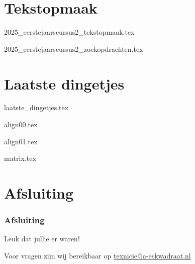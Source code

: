 \documentclass[allauthors,dutch]{../../cursuspresentatie}
\def\importslidej#1#2{%
	{#2}
}
\def\importslidey#1#2{%
	{#2}
}
\begin{document}
\section{Tekstopmaak}
\def\placetarget{\hypertarget{tekstopmaak}{}}
\importslidej{cursus2}{2025_eerstejaarscursus2_tekstopmaak.tex}
\importslidej{cursus2}{2025_eerstejaarscursus2_zoekopdrachten.tex}

\section{Laatste dingetjes}
\def\placetarget{\hypertarget{laatste}{}}
\importslidey{2025-eerstejaars_cursus_2}{laatste_dingetjes.tex}
\importslidey{2025-eerstejaars_cursus_2}{align00.tex}
\importslidey{2025-eerstejaars_cursus_2}{align01.tex}
\importslidey{2025-eerstejaars_cursus_2}{matrix.tex}

\section{Afsluiting}
\begin{frame}
	\frametitle{Afsluiting}
	Leuk dat jullie er waren!
	
	Voor vragen zijn wij bereikbaar op 
	\href{mailto:texnicie@a-eskwadraat.nl}{texnicie@a-eskwadraat.nl}
\end{frame}
\end{document}
